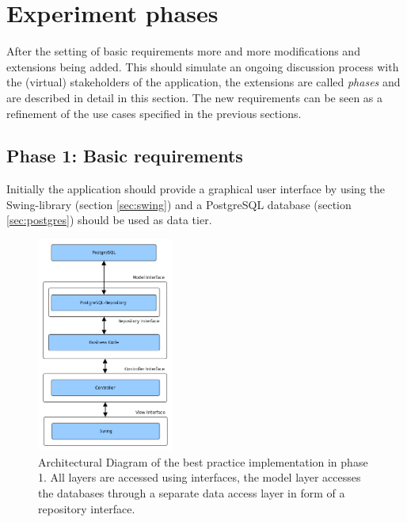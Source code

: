 \section{Experiment phases}
After the setting of basic requirements more and more modifications and extensions being added. This should simulate an ongoing discussion process with the (virtual) stakeholders of the application, the extensions are called \emph{phases} and are described in detail in this section. The new requirements can be seen as a refinement of the use cases specified in the previous sections.

\subsection{Phase 1: Basic requirements} 
Initially the application should provide a graphical user interface by using the Swing-library (section \ref{sec:swing}) and a PostgreSQL database (section \ref{sec:postgres}) should be used as data tier.


\begin{figure}[htbp]
	\centering
	\includegraphics[width=0.4\textwidth]{./content/pictures/bpV1.jpg}
	\caption[Architectual Diagram of the best practice implementation in phase 1.]{Architectural Diagram of the best practice implementation in phase 1. All layers are 
	accessed using interfaces, the model layer accesses the databases through a separate data access layer in form of a repository interface.}
	\label{fig:bpV1}
\end{figure}

